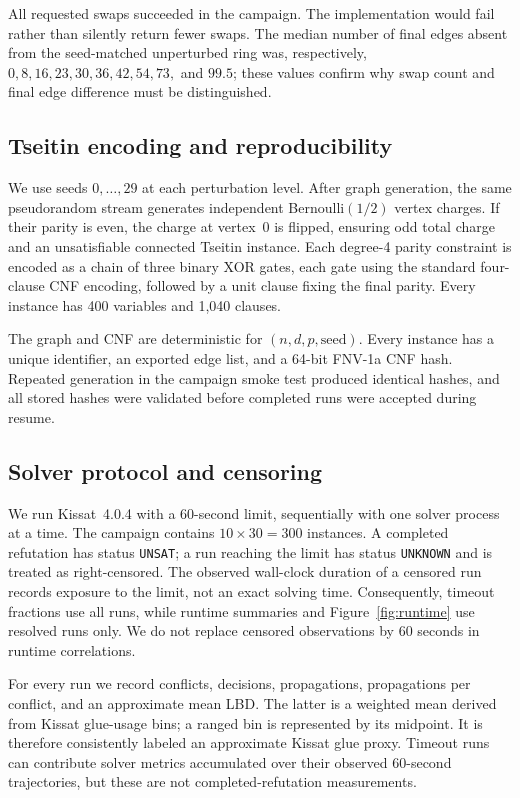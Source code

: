 \documentclass[11pt]{article}
\begin{document}
All requested swaps succeeded in the campaign. The implementation would fail rather than silently return fewer swaps. The median number of final edges absent from the seed-matched unperturbed ring was, respectively, $0,8,16,23,30,36,42,54,73,$ and $99.5$; these values confirm why swap count and final edge difference must be distinguished.

\subsection{Tseitin encoding and reproducibility}

We use seeds $0,\ldots,29$ at each perturbation level. After graph generation, the same pseudorandom stream generates independent Bernoulli$(1/2)$ vertex charges. If their parity is even, the charge at vertex~0 is flipped, ensuring odd total charge and an unsatisfiable connected Tseitin instance. Each degree-4 parity constraint is encoded as a chain of three binary XOR gates, each gate using the standard four-clause CNF encoding, followed by a unit clause fixing the final parity. Every instance has 400 variables and 1,040 clauses.

The graph and CNF are deterministic for $(n,d,p,\text{seed})$. Every instance has a unique identifier, an exported edge list, and a 64-bit FNV-1a CNF hash. Repeated generation in the campaign smoke test produced identical hashes, and all stored hashes were validated before completed runs were accepted during resume.

\subsection{Solver protocol and censoring}

We run Kissat~4.0.4 with a 60-second limit, sequentially with one solver process at a time. The campaign contains $10\times30=300$ instances. A completed refutation has status \texttt{UNSAT}; a run reaching the limit has status \texttt{UNKNOWN} and is treated as right-censored. The observed wall-clock duration of a censored run records exposure to the limit, not an exact solving time. Consequently, timeout fractions use all runs, while runtime summaries and Figure~\ref{fig:runtime} use resolved runs only. We do not replace censored observations by 60 seconds in runtime correlations.

For every run we record conflicts, decisions, propagations, propagations per conflict, and an approximate mean LBD. The latter is a weighted mean derived from Kissat glue-usage bins; a ranged bin is represented by its midpoint. It is therefore consistently labeled an approximate Kissat glue proxy. Timeout runs can contribute solver metrics accumulated over their observed 60-second trajectories, but these are not completed-refutation measurements.
\end{document}
